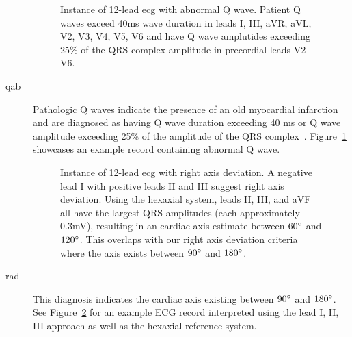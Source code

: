 \documentclass[\main/thesis.tex]{subfiles}
\begin{document}
\begin{description}
    \begin{figure}[H]
        \centering
        \caption{Instance of 12-lead \gls{ecg} with abnormal Q wave. Patient Q waves exceed 40ms wave duration in leads I, III, aVR, aVL, V2, V3, V4, V5, V6 and have Q wave amplutides exceeding 25\% of the QRS complex amplitude in precordial leads V2-V6.}
        \label{fig:full_QAb}
    \end{figure}
    \item[\gls{qab}]Pathologic Q waves indicate the presence of an old myocardial infarction and are diagnosed as having Q wave duration exceeding 40 ms or Q wave amplitude exceeding 25\% of the amplitude of the QRS complex~\cite{doi:10.1002/clc.4960200515}.
    Figure~\ref{fig:full_QAb} showcases an example record containing abnormal Q wave.

    \begin{figure}[H]
        \centering
        \caption{Instance of 12-lead \gls{ecg} with right axis deviation. A negative lead I with positive leads II and III suggest right axis deviation. Using the hexaxial system, leads II, III, and aVF all have the largest QRS amplitudes (each approximately 0.3mV), resulting in an cardiac axis estimate between $60\degree$ and $120\degree$. This overlaps with our right axis deviation criteria where the axis exists between $90\degree$ and $180\degree$.}
        \label{fig:full_RAD}
    \end{figure}
    \item[\gls{rad}] This diagnosis indicates the cardiac axis existing between $90\degree$ and $180\degree$. See Figure~\ref{fig:full_RAD} for an example ECG record interpreted using the lead I, II, III approach as well as the hexaxial reference system.


\end{description}
\end{document}
